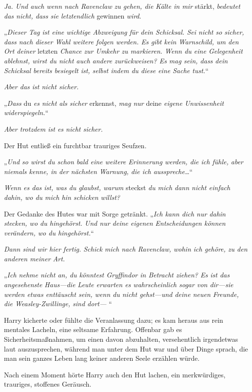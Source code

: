 {\emph{Ja. Und auch wenn nach Ravenclaw zu gehen, die Kälte in mir} stärkt, \emph{bedeutet das nicht, dass sie letztendlich} gewinnen \emph{wird}.

„\emph{Dieser Tag ist eine wichtige Abzweigung für dein Schicksal. Sei nicht so sicher, dass nach dieser Wahl weitere folgen werden. Es gibt kein Warnschild, um den Ort deiner} letzten \emph{Chance zur Umkehr zu markieren. Wenn du eine Gelegenheit ablehnst, wirst du nicht auch andere zurückweisen? Es mag sein, dass dein Schicksal bereits besiegelt ist, selbst indem du diese eine Sache tust.}“

\emph{Aber das ist nicht sicher.}

„\emph{Dass} du \emph{es nicht als sicher} erkennst, \emph{mag nur} deine \emph{eigene Unwissenheit widerspiegeln.}“

\emph{Aber trotzdem ist es nicht sicher.}

Der Hut entließ ein furchtbar trauriges Seufzen.

„\emph{Und so wirst du schon bald eine weitere Erinnerung werden, die ich fühle, aber niemals kenne, in der nächsten Warnung, die ich ausspreche…}“

\emph{Wenn es das ist, was du glaubst, warum} steckst \emph{du mich dann nicht einfach dahin, wo du mich hin schicken willst?}

Der Gedanke des Hutes war mit Sorge getränkt. „\emph{Ich kann dich nur dahin stecken, wo du hingehörst. Und nur deine eigenen Entscheidungen können verändern, wo du hingehörst.}“

\emph{Dann sind wir hier fertig. Schick mich nach Ravenclaw, wohin ich gehöre, zu den anderen meiner Art.}

„\emph{Ich nehme nicht an, du könntest Gryffindor in Betracht ziehen? Es ist das angesehenste Haus—die Leute erwarten es wahrscheinlich sogar von dir—sie werden etwas enttäuscht sein, wenn du nicht gehst—und deine neuen Freunde, die Weasley-Zwillinge, sind dort—} “

Harry kicherte oder fühlte die Veranlassung dazu; es kam heraus aus rein mentales Lacheln, eine seltsame Erfahrung. Offenbar gab es Sicherheitsmaßnahmen, um einen davon abzuhalten, versehentlich irgendetwas laut auszusprechen, während man unter dem Hut war und über Dinge sprach, die man sein ganzes Leben lang keiner anderen Seele erzählen würde.

Nach einem Moment hörte Harry auch den Hut lachen, ein merkwürdiges, trauriges, stoffenes Geräusch.

}
